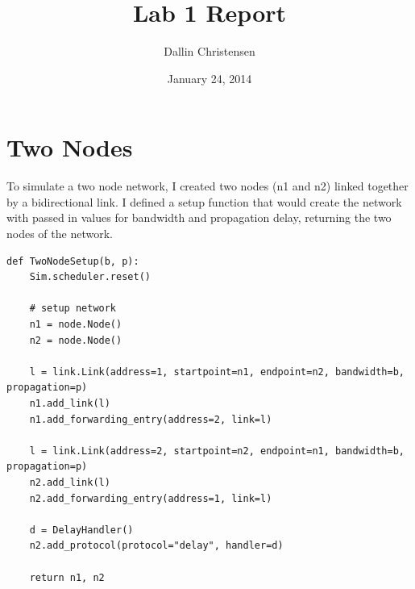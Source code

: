 \documentclass[11pt]{article}
\begin{document}
\lstset{
  language=Python,
  basicstyle=\small,          %
  keywordstyle=\bfseries,
  identifierstyle=,           %
  commentstyle=,              %
  stringstyle=\ttfamily,      %
  showstringspaces=false,     %
  numbers=left,
  numberstyle=\tiny,
  numbersep=5pt,
  frame=tb,
}

\title{Lab 1 Report}

\author{Dallin Christensen}

\date{January 24, 2014}

\maketitle

\section{Two Nodes}

To simulate a two node network, I created two nodes (n1 and n2) linked together by a bidirectional link. I defined a setup function that would create the network with passed in values for bandwidth and propagation delay, returning the two nodes of the network.
\vspace{0.5cm}

\begin{lstlisting}
def TwoNodeSetup(b, p):
    Sim.scheduler.reset()

    # setup network
    n1 = node.Node()
    n2 = node.Node()

    l = link.Link(address=1, startpoint=n1, endpoint=n2, bandwidth=b, propagation=p)
    n1.add_link(l)
    n1.add_forwarding_entry(address=2, link=l)
    
    l = link.Link(address=2, startpoint=n2, endpoint=n1, bandwidth=b, propagation=p)
    n2.add_link(l)
    n2.add_forwarding_entry(address=1, link=l)
    
    d = DelayHandler()
    n2.add_protocol(protocol="delay", handler=d)

    return n1, n2
\end{lstlisting}
\end{document}
